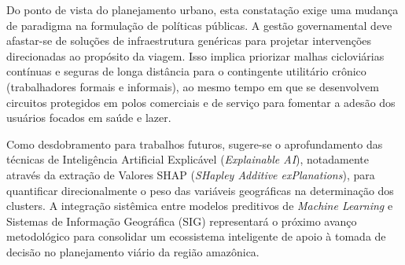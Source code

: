 \documentclass[12pt]{article}
\begin{document}
Do ponto de vista do planejamento urbano, esta constatação exige uma mudança de paradigma na formulação de políticas públicas. A gestão governamental deve afastar-se de soluções de infraestrutura genéricas para projetar intervenções direcionadas ao propósito da viagem. Isso implica priorizar malhas cicloviárias contínuas e seguras de longa distância para o contingente utilitário crônico (trabalhadores formais e informais), ao mesmo tempo em que se desenvolvem circuitos protegidos em polos comerciais e de serviço para fomentar a adesão dos usuários focados em saúde e lazer.

Como desdobramento para trabalhos futuros, sugere-se o aprofundamento das técnicas de Inteligência Artificial Explicável (\textit{Explainable AI}), notadamente através da extração de Valores SHAP (\textit{SHapley Additive exPlanations}), para quantificar direcionalmente o peso das variáveis geográficas na determinação dos clusters. A integração sistêmica entre modelos preditivos de \textit{Machine Learning} e Sistemas de Informação Geográfica (SIG) representará o próximo avanço metodológico para consolidar um ecossistema inteligente de apoio à tomada de decisão no planejamento viário da região amazônica.


 
\end{document}

